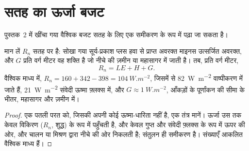 \section{सतह का ऊर्जा बजट}\label{sec:b1:radiation-heat-transport:surface}

पुस्तक~2 में खींचा गया वैश्विक बजट सतह के लिए एक समीकरण के रूप में पढ़ा जा सकता है।

\begin{proposition}[सतह ऊर्जा संतुलन]\label{prop:b1:radiation-heat-transport:surface}
मान लें $R_n$ सतह पर  है: सोखा गया सूर्य-प्रकाश प्लस हवा से प्राप्त अवरक्त माइनस उत्सर्जित अवरक्त, और $G$ प्रति वर्ग मीटर वह शक्ति है जो नीचे की ज़मीन या महासागर में जाती है। तब, प्रति वर्ग मीटर,
\[
  R_n = LE + H + G .
\]
वैश्विक माध्य में, $R_n = 160 + 342 - 398 = \qty{104}{W.m^{-2}}$, जिसमें से
\qty{82}{W.m^{-2}} वाष्पीकरण में जाते हैं, \qty{21}{W.m^{-2}} संवेदी ऊष्मा फ़्लक्स में, और $G \approx \qty{1}{W.m^{-2}}$, आँकड़ों के पूर्णांकन की सीमा के भीतर, महासागर और ज़मीन में।
\end{proposition}

\begin{proof}
एक पतली परत को, जिसकी अपनी कोई ऊष्मा-धारिता नहीं है, एक तंत्र मानें। ऊर्जा उस तक केवल विकिरण ($R_n$, शुद्ध) के रूप में पहुँचती है, और केवल गुप्त और संवेदी फ़्लक्स के रूप में ऊपर की ओर, और चालन या मिश्रण द्वारा नीचे की ओर निकलती है; संतुलन ही समीकरण है। संख्याएँ आकलित वैश्विक माध्य हैं।
\end{proof}

